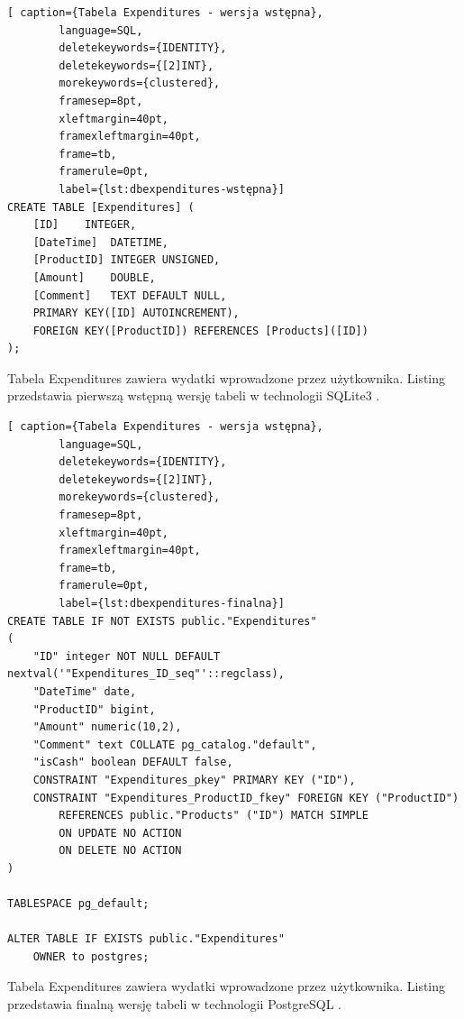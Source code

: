 \documentclass[a4paper,10pt, twoside]{report}
\begin{document}
\begin{large}
\begin{minipage}{\textwidth}
    \begin{lstlisting}[ caption={Tabela Expenditures - wersja wstępna},
        language=SQL,
        deletekeywords={IDENTITY},
        deletekeywords={[2]INT},
        morekeywords={clustered},
        framesep=8pt,
        xleftmargin=40pt,
        framexleftmargin=40pt,
        frame=tb,
        framerule=0pt,
        label={lst:dbexpenditures-wstępna}]
CREATE TABLE [Expenditures] (
    [ID]	INTEGER,
    [DateTime]	DATETIME,
    [ProductID]	INTEGER UNSIGNED,
    [Amount]	DOUBLE,
    [Comment]	TEXT DEFAULT NULL,
    PRIMARY KEY([ID] AUTOINCREMENT),
    FOREIGN KEY([ProductID]) REFERENCES [Products]([ID])
);\end{lstlisting}
{Tabela Expenditures zawiera wydatki wprowadzone przez użytkownika. Listing 
przedstawia pierwszą wstępną wersję tabeli w technologii SQLite3 \cite{SQLite}.}
\end{minipage}

\begin{minipage}{\textwidth}
    \begin{lstlisting}[ caption={Tabela Expenditures - wersja wstępna},
        language=SQL,
        deletekeywords={IDENTITY},
        deletekeywords={[2]INT},
        morekeywords={clustered},
        framesep=8pt,
        xleftmargin=40pt,
        framexleftmargin=40pt,
        frame=tb,
        framerule=0pt,
        label={lst:dbexpenditures-finalna}]
CREATE TABLE IF NOT EXISTS public."Expenditures"
(
    "ID" integer NOT NULL DEFAULT nextval('"Expenditures_ID_seq"'::regclass),
    "DateTime" date,
    "ProductID" bigint,
    "Amount" numeric(10,2),
    "Comment" text COLLATE pg_catalog."default",
    "isCash" boolean DEFAULT false,
    CONSTRAINT "Expenditures_pkey" PRIMARY KEY ("ID"),
    CONSTRAINT "Expenditures_ProductID_fkey" FOREIGN KEY ("ProductID")
        REFERENCES public."Products" ("ID") MATCH SIMPLE
        ON UPDATE NO ACTION
        ON DELETE NO ACTION
)

TABLESPACE pg_default;

ALTER TABLE IF EXISTS public."Expenditures"
    OWNER to postgres;\end{lstlisting}
{Tabela Expenditures zawiera wydatki wprowadzone przez użytkownika. Listing 
przedstawia finalną wersję tabeli w technologii PostgreSQL \cite{PostgreSQL}.}
\end{minipage}


\end{large}
\end{document}
